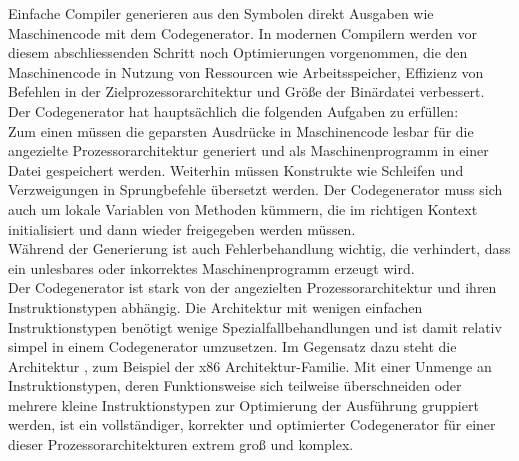 Einfache Compiler generieren aus den Symbolen direkt Ausgaben wie Maschinencode mit dem Codegenerator.
In modernen Compilern werden vor diesem abschliessenden Schritt noch Optimierungen vorgenommen, die den Maschinencode in Nutzung von Ressourcen wie Arbeitsspeicher, Effizienz von Befehlen in der Zielprozessorarchitektur und Größe der Binärdatei verbessert.\\

Der Codegenerator hat hauptsächlich die folgenden Aufgaben zu erfüllen\cite{mossenbock:2024}:\\
Zum einen müssen die geparsten Ausdrücke in Maschinencode lesbar für die angezielte Prozessorarchitektur generiert und als Maschinenprogramm in einer Datei gespeichert werden.
Weiterhin müssen Konstrukte wie Schleifen und Verzweigungen in Sprungbefehle übersetzt werden.
Der Codegenerator muss sich auch um lokale Variablen von Methoden kümmern, die im richtigen Kontext initialisiert und dann wieder freigegeben werden müssen.\\
Während der Generierung ist auch Fehlerbehandlung wichtig, die verhindert, dass ein unlesbares oder inkorrektes Maschinenprogramm erzeugt wird.\\

Der Codegenerator ist stark von der angezielten Prozessorarchitektur und ihren Instruktionstypen abhängig.
Die  Architektur mit wenigen einfachen Instruktionstypen benötigt wenige Spezialfallbehandlungen und ist damit relativ simpel in einem Codegenerator umzusetzen.
Im Gegensatz dazu steht die Architektur , zum Beispiel der x86 Architektur-Familie. 
Mit einer Unmenge an Instruktionstypen, deren Funktionsweise sich teilweise überschneiden oder mehrere kleine Instruktionstypen zur Optimierung der Ausführung gruppiert werden, ist ein vollständiger, korrekter und optimierter Codegenerator für einer dieser Prozessorarchitekturen extrem groß und komplex.
